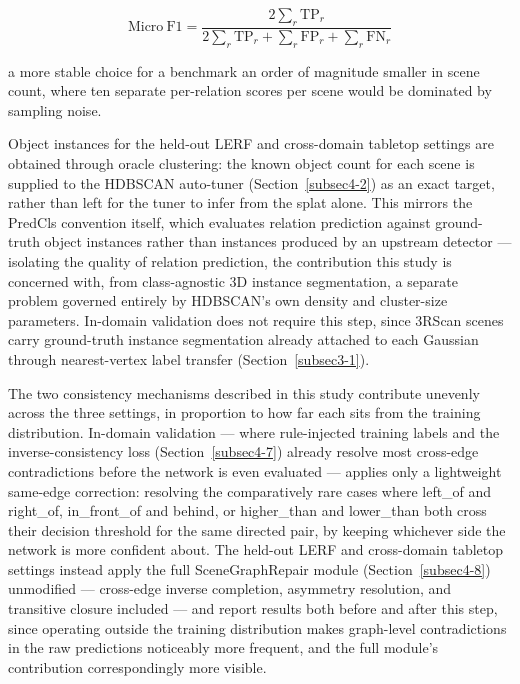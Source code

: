 \documentclass[sn-mathphys,Numbered]{sn-jnl}
\begin{document}
\begin{equation}
\mathrm{Micro\ F1} = \frac{2 \sum_r \mathrm{TP}_r}{2 \sum_r \mathrm{TP}_r + \sum_r \mathrm{FP}_r + \sum_r \mathrm{FN}_r}
\label{eq:microf1}
\end{equation}

a more stable choice for a benchmark an order of magnitude smaller in scene count, where ten separate per-relation scores per scene would be dominated by sampling noise.

Object instances for the held-out LERF and cross-domain tabletop settings are obtained through oracle clustering: the known object count for each scene is supplied to the HDBSCAN auto-tuner (Section~\ref{subsec4-2}) as an exact target, rather than left for the tuner to infer from the splat alone. This mirrors the PredCls convention itself, which evaluates relation prediction against ground-truth object instances rather than instances produced by an upstream detector --- isolating the quality of relation prediction, the contribution this study is concerned with, from class-agnostic 3D instance segmentation, a separate problem governed entirely by HDBSCAN's own density and cluster-size parameters. In-domain validation does not require this step, since 3RScan scenes carry ground-truth instance segmentation already attached to each Gaussian through nearest-vertex label transfer (Section~\ref{subsec3-1}).

The two consistency mechanisms described in this study contribute unevenly across the three settings, in proportion to how far each sits from the training distribution. In-domain validation --- where rule-injected training labels and the inverse-consistency loss (Section~\ref{subsec4-7}) already resolve most cross-edge contradictions before the network is even evaluated --- applies only a lightweight same-edge correction: resolving the comparatively rare cases where left\_of and right\_of, in\_front\_of and behind, or higher\_than and lower\_than both cross their decision threshold for the same directed pair, by keeping whichever side the network is more confident about. The held-out LERF and cross-domain tabletop settings instead apply the full SceneGraphRepair module (Section~\ref{subsec4-8}) unmodified --- cross-edge inverse completion, asymmetry resolution, and transitive closure included --- and report results both before and after this step, since operating outside the training distribution makes graph-level contradictions in the raw predictions noticeably more frequent, and the full module's contribution correspondingly more visible.
\end{document}
